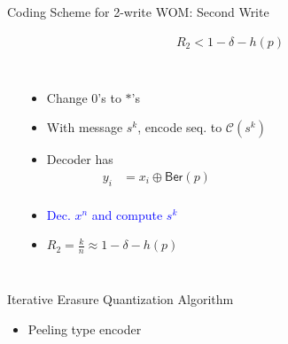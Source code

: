 \documentclass[10pt,presentation]{beamer}
\def\WOM_path{../compound-codes/WOM/slides/Figures}
\begin{document}
\begin{frame}{Coding Scheme for 2-write WOM: Second Write}
  \vspace{-2cm}
  \begin{center}
    \begin{align*}
      R_2 < 1 - \delta - h(p)
    \end{align*}
  \end{center}
  \vspace{-0.5cm}
  \begin{columns}
    \begin{center}
      \scalebox{0.5}{}
    \end{center}

    \begin{itemize}
    \item<1-> \alert{Change $0$'s to $*$'s}
    \item<1-> With message $s^k$, encode seq. to $\mathcal{C}(s^k)$
    \item<2-> Decoder has
      \small{
        \begin{align*}
          y_i&=x_i \oplus \mathsf{Ber}(p) \\
        \end{align*}
      }
    \vspace{-1.25cm}
    \item <3-> \textcolor{blue}{Dec. $x^n$ and compute $s^k$}
    \item <3-> $R_2=\tfrac{k}{n}\approx 1 - \delta - h(p)$
    \end{itemize}
  \end{columns}
\end{frame}

\begin{frame}{Iterative Erasure Quantization Algorithm}
  \begin{center}
    \scalebox{0.5}{}
  \end{center}
  \begin{itemize}
  \item \alert{Peeling type encoder}
  \begin{center}
  \end{center}

  \end{itemize}
\end{frame}
\end{document}
